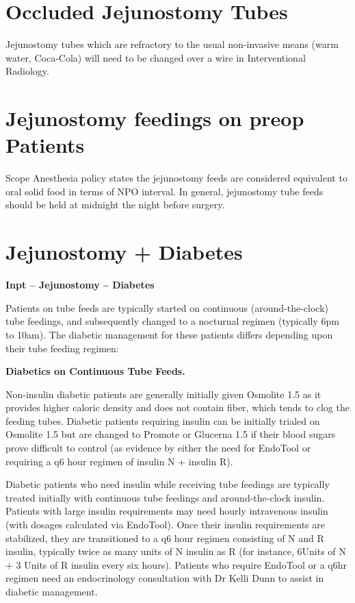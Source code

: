 \documentclass[
]{book}
\begin{document}
\hypertarget{occluded-jejunostomy-tubes}{%
\section{Occluded Jejunostomy Tubes}\label{occluded-jejunostomy-tubes}}

Jejunostomy tubes which are refractory to the usual non-invasive means (warm water, Coca-Cola) will need to be changed over a wire in Interventional Radiology.

\hypertarget{jejunostomy-feedings-on-preop-patients}{%
\section{Jejunostomy feedings on preop Patients}\label{jejunostomy-feedings-on-preop-patients}}

Scope Anesthesia policy states the jejunostomy feeds are considered equivalent to oral solid food in terms of NPO interval. In general, jejunostomy tube feeds should be held at midnight the night before surgery.

\hypertarget{jejunostomy_diabetes}{%
\section{Jejunostomy + Diabetes}\label{jejunostomy_diabetes}}

\textbf{Inpt -- Jejunostomy \textasciitilde{} Diabetes}

Patients on tube feeds are typically started on continuous (around-the-clock) tube feedings, and subsequently changed to a nocturnal regimen (typically 6pm to 10am). The diabetic management for these patients differs depending upon their tube feeding regimen:

\textbf{Diabetics on Continuous Tube Feeds.}

Non-insulin diabetic patients are generally initially given Osmolite 1.5 as it provides higher caloric density and does not contain fiber, which tends to clog the feeding tubes. Diabetic patients requiring insulin can be initially trialed on Osmolite 1.5 but are changed to Promote or Glucerna 1.5 if their blood sugars prove difficult to control (as evidence by either the need for EndoTool or requiring a q6 hour regimen of insulin N + insulin R).

Diabetic patients who need insulin while receiving tube feedings are typically treated initially with continuous tube feedings and around-the-clock insulin. Patients with large insulin requirements may need hourly intravenous insulin (with dosages calculated via EndoTool). Once their insulin requirements are stabilized, they are transitioned to a q6 hour regimen consisting of N and R insulin, typically twice as many units of N insulin as R (for instance, 6Units of N + 3 Units of R insulin every six hours). Patients who require EndoTool or a q6hr regimen need an endocrinology consultation with Dr Kelli Dunn to assist in diabetic management.
\end{document}
